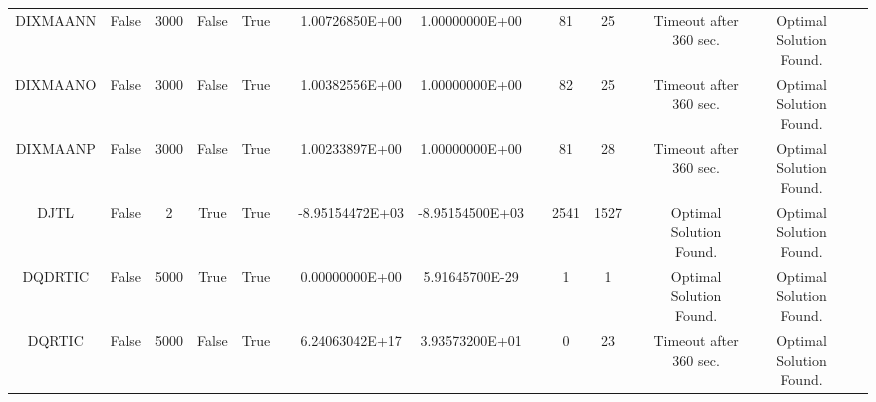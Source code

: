 \begin{longtable}{ccccccccccccccc}
	\cellcolor{default2} DIXMAANN& \cellcolor{default2} False& \cellcolor{default2} 3000& \cellcolor{default2} False& \cellcolor{default2} True& \cellcolor{header} & \cellcolor{poor} 1.00726850E+00& \cellcolor{best} 1.00000000E+00& \cellcolor{header} & \cellcolor{poor} 81& \cellcolor{best} 25& \cellcolor{header} & \cellcolor{default2} Timeout after 360 sec.& \cellcolor{default2} Optimal Solution Found.& \cellcolor{header} \\
	\cellcolor{default1} DIXMAANO& \cellcolor{default1} False& \cellcolor{default1} 3000& \cellcolor{default1} False& \cellcolor{default1} True& \cellcolor{header} & \cellcolor{poor} 1.00382556E+00& \cellcolor{best} 1.00000000E+00& \cellcolor{header} & \cellcolor{poor} 82& \cellcolor{best} 25& \cellcolor{header} & \cellcolor{default1} Timeout after 360 sec.& \cellcolor{default1} Optimal Solution Found.& \cellcolor{header} \\
	\cellcolor{default2} DIXMAANP& \cellcolor{default2} False& \cellcolor{default2} 3000& \cellcolor{default2} False& \cellcolor{default2} True& \cellcolor{header} & \cellcolor{poor} 1.00233897E+00& \cellcolor{best} 1.00000000E+00& \cellcolor{header} & \cellcolor{poor} 81& \cellcolor{best} 28& \cellcolor{header} & \cellcolor{default2} Timeout after 360 sec.& \cellcolor{default2} Optimal Solution Found.& \cellcolor{header} \\
	\cellcolor{default1} DJTL& \cellcolor{default1} False& \cellcolor{default1} 2& \cellcolor{default1} True& \cellcolor{default1} True& \cellcolor{header} & \cellcolor{ok} -8.95154472E+03& \cellcolor{best} -8.95154500E+03& \cellcolor{header} & \cellcolor{ok} 2541& \cellcolor{best} 1527& \cellcolor{header} & \cellcolor{default1} Optimal Solution Found.& \cellcolor{default1} Optimal Solution Found.& \cellcolor{header} \\
	\cellcolor{default2} DQDRTIC& \cellcolor{default2} False& \cellcolor{default2} 5000& \cellcolor{default2} True& \cellcolor{default2} True& \cellcolor{header} & \cellcolor{best} 0.00000000E+00& \cellcolor{ok} 5.91645700E-29& \cellcolor{header} & \cellcolor{best} 1& \cellcolor{best} 1& \cellcolor{header} & \cellcolor{default2} Optimal Solution Found.& \cellcolor{default2} Optimal Solution Found.& \cellcolor{header} \\
	\cellcolor{default1} DQRTIC& \cellcolor{default1} False& \cellcolor{default1} 5000& \cellcolor{default1} False& \cellcolor{default1} True& \cellcolor{header} & \cellcolor{poor} 6.24063042E+17& \cellcolor{best} 3.93573200E+01& \cellcolor{header} & \cellcolor{best} 0& \cellcolor{poor} 23& \cellcolor{header} & \cellcolor{default1} Timeout after 360 sec.& \cellcolor{default1} Optimal Solution Found.& \cellcolor{header} \\

\end{longtable}
